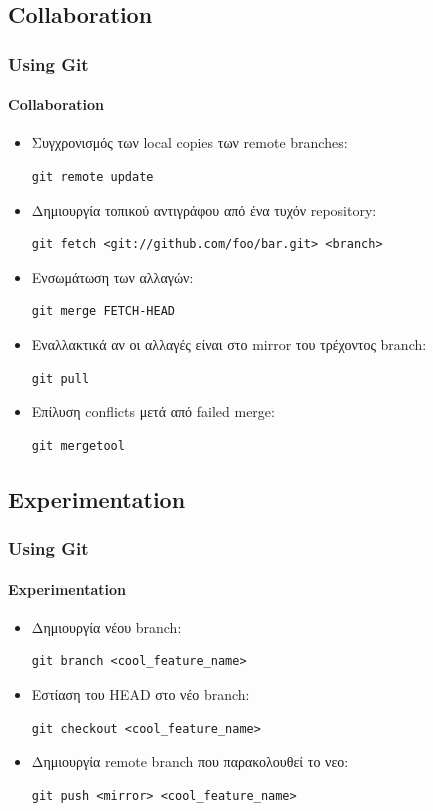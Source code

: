 \documentclass[]{beamer}
\begin{document}
\subsection{Collaboration}

\begin{frame}[fragile]
  \frametitle{Using Git}
  \framesubtitle{Collaboration}
  \begin{itemize}
    \item Συγχρονισμός των local copies των remote branches:
\begin{verbatim}
git remote update
\end{verbatim}
    \item Δημιουργία τοπικού αντιγράφου από ένα τυχόν repository:
\begin{verbatim}
git fetch <git://github.com/foo/bar.git> <branch>
\end{verbatim}
    \item Ενσωμάτωση των αλλαγών:
\begin{verbatim}
git merge FETCH-HEAD
\end{verbatim}
    \item Εναλλακτικά αν οι αλλαγές είναι στο mirror του τρέχοντος branch:
\begin{verbatim}
git pull
\end{verbatim}
    \item Επίλυση conflicts μετά από failed merge:
\begin{verbatim}
git mergetool
\end{verbatim}
  \end{itemize}
\end{frame}

\subsection{Experimentation}

\begin{frame}[fragile]
  \frametitle{Using Git}
  \framesubtitle{Experimentation}
  \begin{itemize}
    \item Δημιουργία νέου branch:
\begin{verbatim}
git branch <cool_feature_name>
\end{verbatim}
    \item Εστίαση του HEAD στο νέο branch:
\begin{verbatim}
git checkout <cool_feature_name>
\end{verbatim}
    \item Δημιουργία remote branch που παρακολουθεί το νεο:
\begin{verbatim}
git push <mirror> <cool_feature_name>
\end{verbatim}
  \end{itemize}
\end{frame}
\end{document}
